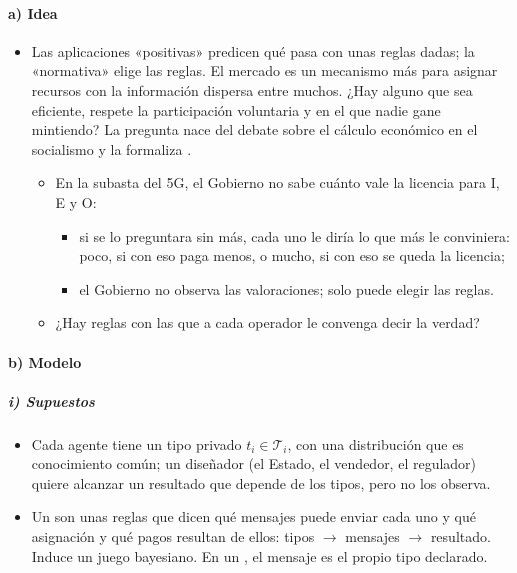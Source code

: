 \documentclass[11pt]{article}
\begin{document}
\paragraph{a) Idea}

\begin{itemize}
\item Las aplicaciones «positivas» predicen qué pasa con unas reglas dadas; la «normativa» elige las reglas. El mercado es un mecanismo más para asignar recursos con la información dispersa entre muchos. ¿Hay alguno que sea eficiente, respete la participación voluntaria y en el que nadie gane mintiendo? La pregunta nace del debate sobre el cálculo económico en el socialismo  y la formaliza \textcites{Hurwicz1960Optimality}{Hurwicz1972Informationally}.
  \begin{itemize}
  \item En la subasta del 5G, el Gobierno no sabe cuánto vale la licencia para \textup{I}, E y O:
    \begin{itemize}
    \item si se lo preguntara sin más, cada uno le diría lo que más le conviniera: poco, si con eso paga menos, o mucho, si con eso se queda la licencia;
    \item el Gobierno no observa las valoraciones; solo puede elegir las reglas.
    \end{itemize}
  \item ¿Hay reglas con las que a cada operador le convenga decir la verdad?
  \end{itemize}
\end{itemize}

\paragraph{b) Modelo}

\subparagraph{i) Supuestos}

\begin{itemize}
\item Cada agente tiene un tipo privado $t_i\in\mathcal{T}_i$, con una distribución que es conocimiento común; un diseñador (el Estado, el vendedor, el regulador) quiere alcanzar un resultado que depende de los tipos, pero no los observa.
\item Un  son unas reglas que dicen qué mensajes puede enviar cada uno y qué asignación y qué pagos resultan de ellos: tipos $\to$ mensajes $\to$ resultado. Induce un juego bayesiano. En un , el mensaje es el propio tipo declarado.
\end{itemize}
\end{document}
